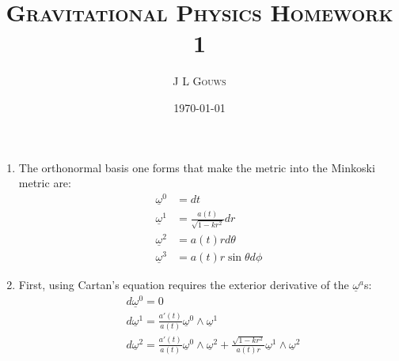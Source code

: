 \documentclass[12pt,a4]{article}
\title{
\textsc{Gravitational Physics Homework 1}
}
\author{\textsc{J L Gouws}
}
\date{\today
\\[1cm]}
\begin{document}
\thispagestyle{empty}

\maketitle

\begin{enumerate}
  \item
    The orthonormal basis one forms that make the metric into the Minkoski metric are:
    \begin{align*}
      \underline{\omega}^0 &= dt\\
      \underline{\omega}^1 &= \frac{a(t)}{\sqrt{1- k r^2}} dr\\
      \underline{\omega}^2 &= a(t) r d\theta\\
      \underline{\omega}^3 &= a(t) r \sin \theta d \phi
    \end{align*}
  \item
    First, using Cartan's equation requires the exterior derivative of the $\underline{\omega}^a$s:
    \begin{align*}
      &d \underline{\omega} ^ 0 = 0\\
      &d \underline{\omega} ^ 1 = \frac{a'(t)}{a(t)} \underline{\omega}^0 \wedge \underline{\omega}^1\\
      &d \underline{\omega} ^ 2 = \frac{a'(t)}{a(t)} \underline{\omega}^0 \wedge \underline{\omega}^2 + \frac{\sqrt{1 - k r^2}}{a(t)r} \underline{\omega}^1 \wedge \underline{\omega}^2\\

\end{align*}
\end{enumerate}
\end{document}
